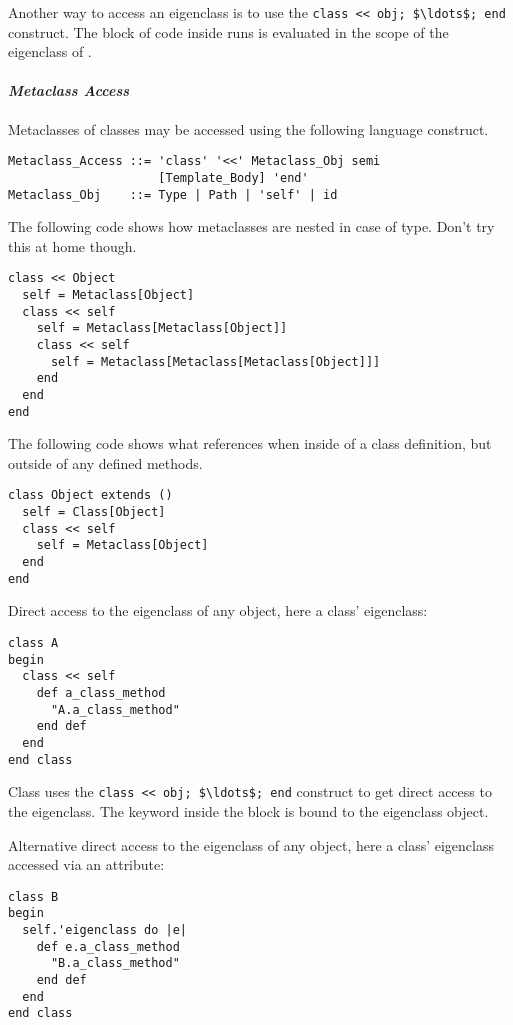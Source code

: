 Another way to access an eigenclass is to use the \lstinline!class << obj; $\ldots$; end! construct. The block of code inside runs is evaluated in the scope of the eigenclass of . 

\paragraph{\em Metaclass Access}
Metaclasses of classes may be accessed using the following language construct. 

\grammar\begin{lstlisting}
Metaclass_Access ::= 'class' '<<' Metaclass_Obj semi 
                     [Template_Body] 'end'
Metaclass_Obj    ::= Type | Path | 'self' | id
\end{lstlisting}

\example The following code shows how metaclasses are nested in case of  type. Don't try this at home though. 
\begin{lstlisting}
class << Object
  self = Metaclass[Object]
  class << self
    self = Metaclass[Metaclass[Object]]
    class << self
      self = Metaclass[Metaclass[Metaclass[Object]]]
    end
  end
end
\end{lstlisting}

\example The following code shows what  references when inside of a class definition, but outside of any defined methods. 
\begin{lstlisting}
class Object extends ()
  self = Class[Object]
  class << self
    self = Metaclass[Object]
  end
end
\end{lstlisting}

\example Direct access to the eigenclass of any object, here a class' eigenclass:
\begin{lstlisting}
class A
begin
  class << self
    def a_class_method
      "A.a_class_method"
    end def
  end
end class
\end{lstlisting}
Class  uses the \lstinline!class << obj; $\ldots$; end! construct to get direct access to the eigenclass. The keyword  inside the block is bound to the eigenclass object. 

\example Alternative direct access to the eigenclass of any object, here a class' eigenclass accessed via an attribute:
\begin{lstlisting}
class B
begin
  self.'eigenclass do |e|
    def e.a_class_method
      "B.a_class_method"
    end def
  end
end class
\end{lstlisting} 

